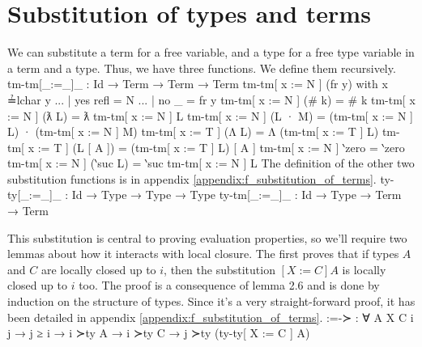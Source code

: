 \documentclass[logo,bsc,singlespacing,parskip,online]{infthesis}
\renewenvironment{code}{\mintedcopy[breaklines,breaksymbolleft=\;]{agda}}{\endmintedcopy}
\begin{document}
\section{Substitution of types and terms}
We can substitute a term for a free variable, and a type for a free type variable in a term and a
type. Thus, we have three functions. We define them recursively.
\begin{code}
  tm-tm[_:=_]_ : Id → Term → Term → Term
  tm-tm[ x := N ] (fr y) with x ≟lchar y
  ... | yes refl = N
  ... | no  _    = fr y
  tm-tm[ x := N ] (# k) = # k
  tm-tm[ x := N ] (ƛ L) = ƛ tm-tm[ x := N ] L
  tm-tm[ x := N ] (L · M) = (tm-tm[ x := N ] L) · (tm-tm[ x := N ] M)
  tm-tm[ x := T ] (Λ L) = Λ (tm-tm[ x := T ] L)
  tm-tm[ x := T ] (L [ A ]) = (tm-tm[ x := T ] L) [ A ]
  tm-tm[ x := N ] ‵zero = ‵zero
  tm-tm[ x := N ] (‵suc L) = ‵suc tm-tm[ x := N ] L
\end{code}
The definition of the other two substitution functions is in appendix
\ref{appendix:f_substitution_of_terms}.
\begin{code}
  ty-ty[_:=_]_ : Id → Type → Type → Type
  ty-tm[_:=_]_ : Id → Type → Term → Term
\end{code}
\begin{comment}
\begin{code}
  ty-ty[ X := T ] ‵ℕ = ‵ℕ
  ty-ty[ X := T ] (t-fr Y) with X ≟lchar Y
  ... | yes refl = T
  ... | no  _    = t-fr Y
  ty-ty[ X := T ] (t-# k) = t-# k
  ty-ty[ X := T ] (A ⇒ B) = (ty-ty[ X := T ] A) ⇒ (ty-ty[ X := T ] B)
  ty-ty[ X := T ] (t-∀ A) = t-∀ (ty-ty[ X := T ] A)

  ty-tm[ X := T ] (fr x) = fr x
  ty-tm[ X := T ] (# k) = # k
  ty-tm[ X := T ] (ƛ L) = ƛ (ty-tm[ X := T ] L)
  ty-tm[ X := T ] (L · M) = (ty-tm[ X := T ] L) · (ty-tm[ X := T ] M)
  ty-tm[ X := T ] (Λ L) = Λ (ty-tm[ X := T ] L)
  ty-tm[ X := T ] (L [ A ]) = (ty-tm[ X := T ] L) [ ty-ty[ X := T ] A ]
  ty-tm[ X := T ] ‵zero = ‵zero
  ty-tm[ X := T ] (‵suc L) = ‵suc ty-tm[ X := T ] L
\end{code}
\end{comment}

This substitution is central to proving evaluation properties, so we'll require two lemmas about how
it interacts with local closure. The first proves that if types $A$ and $C$ are locally closed up to
$i$, then the substitution $[X := C] A$ is locally closed up to $i$ too. The proof is a consequence
of lemma 2.6 and is done by induction on the structure of types. Since it's a very straight-forward
proof, it has been detailed in appendix \ref{appendix:f_substitution_of_terms}.
\begin{code}
  :=-≻ : ∀ {A X C i j} → j ≥ i → i ≻ty A → i ≻ty C
    → j ≻ty (ty-ty[ X := C ] A)
\end{code}
\end{document}
